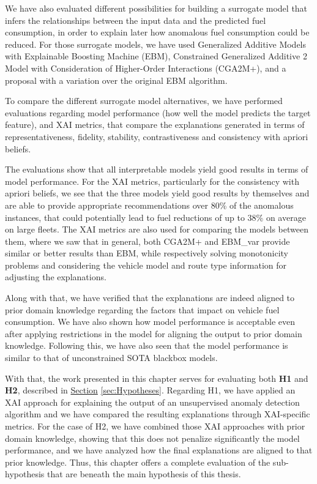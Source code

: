 We have also evaluated different possibilities for building a surrogate model that infers the relationships between the input data and the predicted fuel consumption, in order to explain later how anomalous fuel consumption could be reduced. For those surrogate models, we have used Generalized Additive Models with Explainable Boosting Machine (EBM), Constrained Generalized Additive 2 Model with Consideration of Higher-Order Interactions (CGA2M+), and a proposal with a variation over the original EBM algorithm. 

To compare the different surrogate model alternatives, we have performed evaluations regarding model performance (how well the model predicts the target feature), and XAI metrics, that compare the explanations generated in terms of representativeness, fidelity, stability, contrastiveness and consistency with apriori beliefs. 

The evaluations show that all interpretable models yield good results in terms of model performance. For the XAI metrics, particularly for the consistency with apriori beliefs, we see that the three models yield good results by themselves and are able to provide appropriate recommendations over 80\% of the anomalous instances, that could potentially lead to fuel reductions of up to 38\% on average on large fleets. The XAI metrics are also used for comparing the models between them, where we saw that in general, both CGA2M+ and EBM\_var provide similar or better results than EBM, while respectively solving monotonicity problems and considering the vehicle model and route type information for adjusting the explanations.

Along with that, we have verified that the explanations are indeed aligned to prior domain knowledge regarding the factors that impact on vehicle fuel consumption. We have also shown how model performance is acceptable even after applying restrictions in the model for aligning the output to prior domain knowledge. Following this, we have also seen that the model performance is similar to that of unconstrained SOTA blackbox models.

With that, the work presented in this chapter serves for evaluating both \textbf{H1} and \textbf{H2}, described in \hyperref[sec:Hypotheses]{Section} \ref{sec:Hypotheses}. Regarding H1, we have applied an XAI approach for explaining the output of an unsupervised anomaly detection algorithm and we have compared the resulting explanations through XAI-specific metrics. For the case of H2, we have combined those XAI approaches with prior domain knowledge, showing that this does not penalize significantly the model performance, and we have analyzed how the final explanations are aligned to that prior knowledge.
Thus, this chapter offers a complete evaluation of the sub-hypothesis that are beneath the main hypothesis of this thesis.


